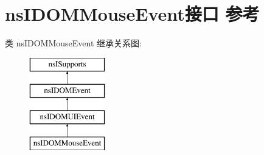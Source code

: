 \hypertarget{interfacens_i_d_o_m_mouse_event}{}\section{ns\+I\+D\+O\+M\+Mouse\+Event接口 参考}
\label{interfacens_i_d_o_m_mouse_event}
类 ns\+I\+D\+O\+M\+Mouse\+Event 继承关系图\+:\begin{figure}[H]
\begin{center}
\leavevmode
\includegraphics[height=4.000000cm]{interfacens_i_d_o_m_mouse_event}
\end{center}
\end{figure}
